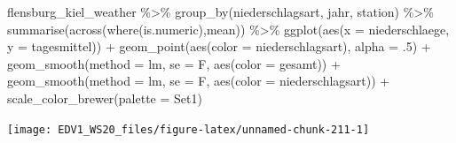 \documentclass[
]{book}
\newenvironment{Shaded}{\begin{snugshade}}{\end{snugshade}}
\newcommand{\AttributeTok}[1]{\textcolor[rgb]{0.77,0.63,0.00}{#1}}
\newcommand{\DecValTok}[1]{\textcolor[rgb]{0.00,0.00,0.81}{#1}}
\newcommand{\FunctionTok}[1]{\textcolor[rgb]{0.00,0.00,0.00}{#1}}
\newcommand{\NormalTok}[1]{#1}
\newcommand{\SpecialCharTok}[1]{\textcolor[rgb]{0.00,0.00,0.00}{#1}}
\newcommand{\StringTok}[1]{\textcolor[rgb]{0.31,0.60,0.02}{#1}}
\begin{document}
\begin{Shaded}
\begin{Highlighting}[]
\NormalTok{flensburg\_kiel\_weather }\SpecialCharTok{\%\textgreater{}\%} 
  \FunctionTok{group\_by}\NormalTok{(niederschlagsart, jahr, station) }\SpecialCharTok{\%\textgreater{}\%} 
  \FunctionTok{summarise}\NormalTok{(}\FunctionTok{across}\NormalTok{(}\FunctionTok{where}\NormalTok{(is.numeric),mean)) }\SpecialCharTok{\%\textgreater{}\%} 
  \FunctionTok{ggplot}\NormalTok{(}\FunctionTok{aes}\NormalTok{(}\AttributeTok{x =}\NormalTok{ niederschlaege, }
             \AttributeTok{y =}\NormalTok{ tagesmittel)) }\SpecialCharTok{+}
  \FunctionTok{geom\_point}\NormalTok{(}\FunctionTok{aes}\NormalTok{(}\AttributeTok{color =}\NormalTok{ niederschlagsart),}
             \AttributeTok{alpha =}\NormalTok{ .}\DecValTok{5}\NormalTok{) }\SpecialCharTok{+}
  \FunctionTok{geom\_smooth}\NormalTok{(}\AttributeTok{method =} \StringTok{\textquotesingle{}lm\textquotesingle{}}\NormalTok{,}
              \AttributeTok{se =}\NormalTok{ F,}
              \FunctionTok{aes}\NormalTok{(}\AttributeTok{color =} \StringTok{\textquotesingle{}gesamt\textquotesingle{}}\NormalTok{)) }\SpecialCharTok{+}
  \FunctionTok{geom\_smooth}\NormalTok{(}\AttributeTok{method =} \StringTok{\textquotesingle{}lm\textquotesingle{}}\NormalTok{,}
              \AttributeTok{se =}\NormalTok{ F,}
              \FunctionTok{aes}\NormalTok{(}\AttributeTok{color =}\NormalTok{ niederschlagsart)) }\SpecialCharTok{+}
  \FunctionTok{scale\_color\_brewer}\NormalTok{(}\AttributeTok{palette =} \StringTok{\textquotesingle{}Set1\textquotesingle{}}\NormalTok{)}
\end{Highlighting}
\end{Shaded}

\begin{center}\texttt{[image: EDV1\_WS20\_files/figure-latex/unnamed-chunk-211-1]} \end{center}

  
\end{document}
